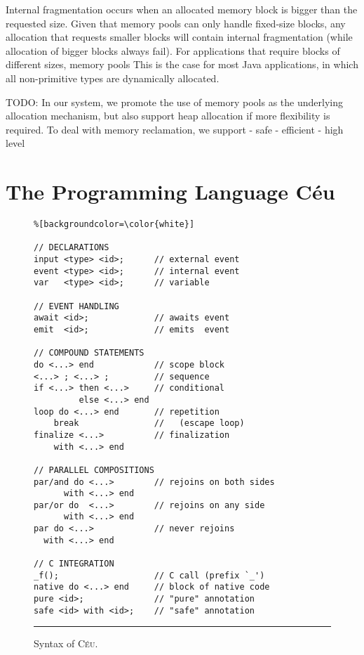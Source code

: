 \documentclass{sig-alternate-ipsn13}
\newcommand{\CEU}{\textsc{C\'{e}u}\xspace}
\begin{document}
Internal fragmentation occurs when an allocated memory block is bigger than the 
requested size.
Given that memory pools can only handle fixed-size blocks, any allocation that 
requests smaller blocks will contain internal fragmentation (while allocation 
of bigger blocks always fail).
For applications that require blocks of different sizes, memory pools
This is the case for most Java applications, in which all non-primitive types 
are dynamically allocated.

TODO:
In our system, we promote the use of memory pools as the underlying allocation 
mechanism, but also support heap allocation if more flexibility is required.
%
To deal with memory reclamation, we support
- safe
- efficient
- high level

\section{The Programming Language C\'eu}


\begin{figure}[t]
\begin{lstlisting}%[backgroundcolor=\color{white}]

// DECLARATIONS
input <type> <id>;      // external event
event <type> <id>;      // internal event
var   <type> <id>;      // variable

// EVENT HANDLING
await <id>;             // awaits event
emit  <id>;             // emits  event

// COMPOUND STATEMENTS
do <...> end            // scope block
<...> ; <...> ;         // sequence
if <...> then <...>     // conditional
         else <...> end
loop do <...> end       // repetition
    break               //   (escape loop)
finalize <...>          // finalization
    with <...> end

// PARALLEL COMPOSITIONS
par/and do <...>        // rejoins on both sides
      with <...> end
par/or do  <...>        // rejoins on any side
      with <...> end
par do <...>            // never rejoins
  with <...> end

// C INTEGRATION
_f();                   // C call (prefix `_')
native do <...> end     // block of native code
pure <id>;              // "pure" annotation
safe <id> with <id>;    // "safe" annotation
\end{lstlisting}
\rule{8.5cm}{0.37pt}
\caption{ Syntax of \CEU.\newline
{\small %
}%
\label{lst.syntax}
}
\end{figure}
\end{document}
